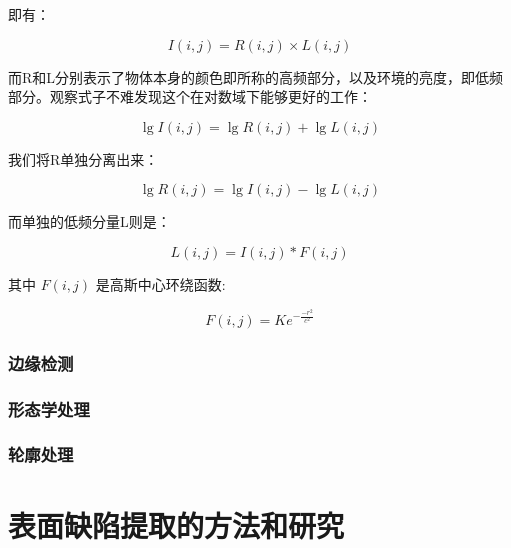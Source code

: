 即有：

\begin{equation}
	I(i,j) = R(i,j) \times L(i,j)
\end{equation}

而R和L分别表示了物体本身的颜色即所称的高频部分，以及环境的亮度，即低频部分。观察式子不难发现这个在对数域下能够更好的工作：

\begin{equation}
	\lg I(i,j) = \lg R(i,j) + \lg L(i,j)
\end{equation}

我们将R单独分离出来：

\begin{equation}
	\lg R(i,j) = \lg I(i,j) - \lg L(i,j)
\end{equation}

而单独的低频分量L则是：

\begin{equation}
	L(i,j) = I(i,j) \ast F(i,j)
\end{equation}

其中 $ F(i,j) $ 是高斯中心环绕函数:

\begin{equation}
	F(i,j) = Ke^{-\frac{-r^2}{c^2}}
\end{equation}


\subsubsection{边缘检测}
\subsubsection{形态学处理}
\subsubsection{轮廓处理}

\section{表面缺陷提取的方法和研究}